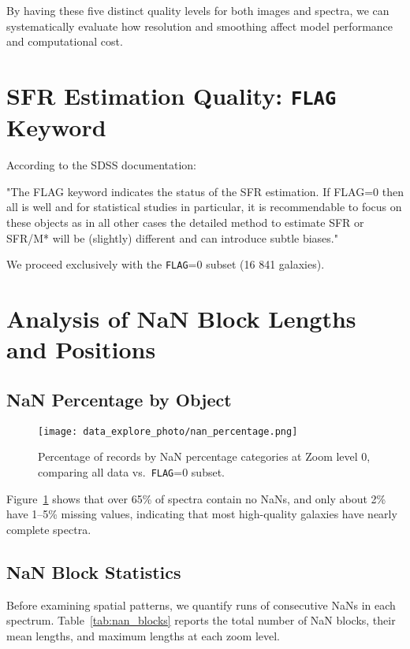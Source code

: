 \documentclass[english,bachelor,oneside]{ctufit-thesis}
\begin{document}
By having these five distinct quality levels for both images and spectra, we can systematically evaluate how resolution and smoothing affect model performance and computational cost.


\section{SFR Estimation Quality: \texttt{FLAG} Keyword}
According to the SDSS documentation:

\begin{displayquote}
"The FLAG keyword indicates the status of the SFR estimation. If FLAG=0 then all is well and for statistical studies in particular, it is recommendable to focus on these objects as in all other cases the detailed method to estimate SFR or SFR/M* will be (slightly) different and can introduce subtle biases." \cite{SDSS_SFR_DOC}
\end{displayquote}

We proceed exclusively with the \texttt{FLAG}=0 subset (16 841 galaxies).

\section{Analysis of NaN Block Lengths and Positions}
\subsection{NaN Percentage by Object}
\begin{figure}[H]
    \centering
    \texttt{[image: data\_explore\_photo/nan\_percentage.png]}
    \caption{Percentage of records by NaN percentage categories at Zoom level 0, comparing all data vs.\ \texttt{FLAG}=0 subset.}
    \label{fig:nan_percentage}
\end{figure}
\noindent
Figure~\ref{fig:nan_percentage} shows that over 65\% of spectra contain no NaNs, and only about 2\% have 1–5\% missing values, indicating that most high-quality galaxies have nearly complete spectra.


\subsection{NaN Block Statistics}
Before examining spatial patterns, we quantify runs of consecutive NaNs in each spectrum. Table~\ref{tab:nan_blocks} reports the total number of NaN blocks, their mean lengths, and maximum lengths at each zoom level.
\end{document}
